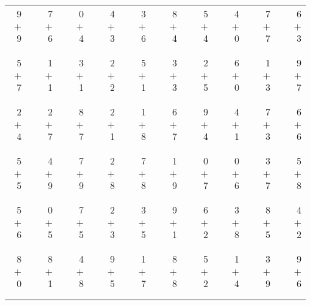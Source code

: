 \documentclass[12pt, letterpaper]{article}
\begin{document}
\begin{tabular}{rrrrrrrrrrrrrrrrrrr}
9 & & 7 & & 0 & & 4 & & 3 & & 8 & & 5 & & 4 & & 7 & & 6\\
$+$ 9 & & $+$ 6 & & $+$ 4 & & $+$ 3 & & $+$ 6 & & $+$ 4 & & $+$ 4 & & $+$ 0 & & $+$ 7 & & $+$ 3\\
\cline{1-1} \cline{3-3} \cline{5-5} \cline{7-7} \cline{9-9} \cline{11-11} \cline{13-13} \cline{15-15} \cline{17-17} \cline{19-19} \\ \\
5 & & 1 & & 3 & & 2 & & 5 & & 3 & & 2 & & 6 & & 1 & & 9\\
$+$ 7 & & $+$ 1 & & $+$ 1 & & $+$ 2 & & $+$ 1 & & $+$ 3 & & $+$ 5 & & $+$ 0 & & $+$ 3 & & $+$ 7\\
\cline{1-1} \cline{3-3} \cline{5-5} \cline{7-7} \cline{9-9} \cline{11-11} \cline{13-13} \cline{15-15} \cline{17-17} \cline{19-19} \\ \\
2 & & 2 & & 8 & & 2 & & 1 & & 6 & & 9 & & 4 & & 7 & & 6\\
$+$ 4 & & $+$ 7 & & $+$ 7 & & $+$ 1 & & $+$ 8 & & $+$ 7 & & $+$ 4 & & $+$ 1 & & $+$ 3 & & $+$ 6\\
\cline{1-1} \cline{3-3} \cline{5-5} \cline{7-7} \cline{9-9} \cline{11-11} \cline{13-13} \cline{15-15} \cline{17-17} \cline{19-19} \\ \\
5 & & 4 & & 7 & & 2 & & 7 & & 1 & & 0 & & 0 & & 3 & & 5\\
$+$ 5 & & $+$ 9 & & $+$ 9 & & $+$ 8 & & $+$ 8 & & $+$ 9 & & $+$ 7 & & $+$ 6 & & $+$ 7 & & $+$ 8\\
\cline{1-1} \cline{3-3} \cline{5-5} \cline{7-7} \cline{9-9} \cline{11-11} \cline{13-13} \cline{15-15} \cline{17-17} \cline{19-19} \\ \\
5 & & 0 & & 7 & & 2 & & 3 & & 9 & & 6 & & 3 & & 8 & & 4\\
$+$ 6 & & $+$ 5 & & $+$ 5 & & $+$ 3 & & $+$ 5 & & $+$ 1 & & $+$ 2 & & $+$ 8 & & $+$ 5 & & $+$ 2\\
\cline{1-1} \cline{3-3} \cline{5-5} \cline{7-7} \cline{9-9} \cline{11-11} \cline{13-13} \cline{15-15} \cline{17-17} \cline{19-19} \\ \\
8 & & 8 & & 4 & & 9 & & 1 & & 8 & & 5 & & 1 & & 3 & & 9\\
$+$ 0 & & $+$ 1 & & $+$ 8 & & $+$ 5 & & $+$ 7 & & $+$ 8 & & $+$ 2 & & $+$ 4 & & $+$ 9 & & $+$ 6\\
\cline{1-1} \cline{3-3} \cline{5-5} \cline{7-7} \cline{9-9} \cline{11-11} \cline{13-13} \cline{15-15} \cline{17-17} \cline{19-19} \\ \\

\end{tabular}
\end{document}
